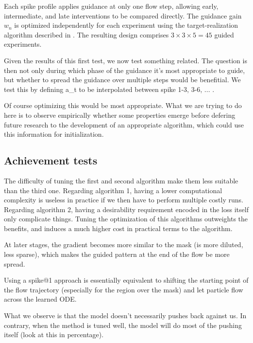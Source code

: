 Each spike profile applies guidance at only one flow step, allowing early,
intermediate, and late interventions to be compared directly. The guidance
gain $w_n$ is optimized independently for each experiment using the
target-realization algorithm described in .
The resulting design comprises $3\times3\times5=45$ guided experiments.

Given the results of this first test, we now test something related.
The question is then not only during which phase of the guidance it's most appropriate to guide,
but whether to spread the guidance over multiple steps would be benefitial.
We test this by defining a\_t to be interpolated between spike 1-3, 3-6, ... .

Of course optimizing this would be most appropriate. 
What we are trying to do here is to observe empirically whether some properties emerge before defering future research to the development of an appropriate algorithm, which could use this information for initialization. 

\subsection{Achievement tests}

The difficulty of tuning the first and second algorithm make them less suitable than the third one.
Regarding algorithm 1, having a lower computational complexity is useless in practice if we then have to perform multiple costly runs.
Regarding algorithm 2, having a desirability requirement encoded in the loss itself only complicate things. 
Tuning the optimization of this algorithms outweights the benefits, and induces a much higher cost in practical terms to the algorithm.

At later stages, the gradient becomes more similar to the mask (is more diluted, less sparse), which makes the guided pattern at the end of the flow be more spread.

Using a spike@1 approach is essentially equivalent to shifting the starting point of the flow trajectory (especially for the region over the mask) and let particle flow across the learned ODE.

What we observe is that the model doesn't necessarily pushes back against us.
In contrary, when the method is tuned well, the model will do most of the pushing itself (look at this in percentage).


